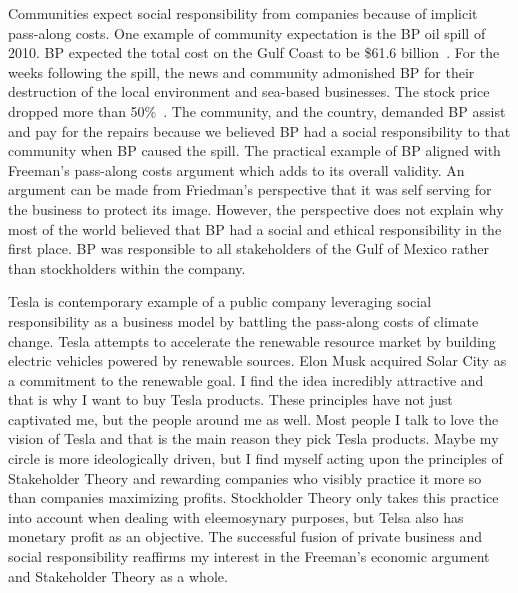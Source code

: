 \documentclass[12pt]{article}
\begin{document}
Communities expect social responsibility from companies because of implicit
pass-along costs. One example of community expectation is the BP oil spill of
2010. BP expected the total cost on the Gulf Coast to be \$61.6
billion~\cite{bp_spill}. For the weeks following the spill, the news and
community admonished BP for their destruction of the local environment and
sea-based businesses. The stock price dropped more than 50\%~\cite{stock}. The
community, and the country, demanded BP assist and pay for the repairs
because we believed BP had a social responsibility to that community when
BP caused the spill. The practical example of BP aligned with Freeman's
pass-along costs argument which adds to its overall validity. An argument can be
made from Friedman's perspective that it was self serving for the business to
protect its image.  However, the perspective does not explain why most of the
world believed that BP had a social and ethical responsibility in the first
place. BP was responsible to all stakeholders of the Gulf of Mexico rather than
stockholders within the company.

Tesla is contemporary example of a public company leveraging social
responsibility as a business model by battling the pass-along costs of climate
change. Tesla attempts to accelerate the renewable resource market by building
electric vehicles powered by renewable sources. Elon Musk acquired Solar City as
a commitment to the renewable goal. I find the idea incredibly attractive and
that is why I want to buy Tesla products. These principles have not just
captivated me, but the people around me as well. Most people I talk to love the
vision of Tesla and that is the main reason they pick Tesla products.  Maybe my
circle is more ideologically driven, but I find myself acting upon the
principles of Stakeholder Theory and rewarding companies who visibly practice it
more so than companies maximizing profits.  Stockholder Theory only takes this
practice into account when dealing with eleemosynary purposes, but Telsa also
has monetary profit as an objective. The successful fusion of private business
and social responsibility reaffirms my interest in the Freeman's economic
argument and Stakeholder Theory as a whole.




\end{document}
